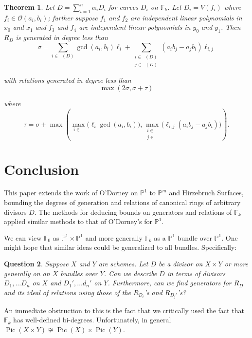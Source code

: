 \documentclass{amsart}
\theoremstyle{plain}
\newtheorem{thm}{Theorem}[section]
\newtheorem{question}[thm]{Question}
\theoremstyle{definition}
\theoremstyle{remark}
\numberwithin{equation}{section}
\newcommand\bp{{\mathbb P}}
\newcommand\sco{{\mathscr O}}
\newcommand\bida{a}
\newcommand\bidb{b}
\newcommand\hirz{\mathbb{F}}
\DeclareMathOperator{\Te}{T_=}
\DeclareMathOperator{\Tp}{T_+}
\DeclareMathOperator{\Tm}{T_-}
\DeclareMathOperator{\Pic}{Pic}
\begin{document}
\begin{thm}
\label{thm:hirz-generators-relations}
Let $D = \sum_{i=1}^n \alpha_i D_i$ for curves $D_i$ on $\hirz_k$.  Let $D_i = V(f_i)$ where $f_i \in \sco(a_i, b_i)$; further suppose $f_1$ and $f_2$ are independent linear
polynomials in $x_0$ and $x_1$ and $f_3$ and $f_4$ are independent
linear polynomials in $y_0$ and $y_1$.
Then $R_D$ is generated in degree less than 
\[
	\sigma = \sum_{i\in \Te(D)} \gcd(\bida_i, \bidb_i)\ell_i +
	\sum_{\substack{i \in \Tp(D) \\	j \in \Tm(D)}} (\bida_i \bidb_j
	- \bida_j \bidb_i) \ell_{i, j}
\]

\noindent
with relations generated in degree less than 
\[
	\max(2 \sigma, \sigma + \tau)
\]

\noindent
where
\[
	\tau = \sigma
	+ \max \left( \max_{i\in \Te} \bigl(\ell_i \gcd(a_i, b_i) \bigr),
	\max_{\substack{i \in \Tp \\ j \in \Tm}} \bigl(\ell_{i, j}
	(\bida_i \bidb_j - \bida_j \bidb_i) \bigr) \right).
\]
\end{thm}


\section{Conclusion}
\label{sec:conc}
This paper extends the work of O'Dorney \cite{dorney:canonical} on $\bp^1$ to $\bp^m$ and Hirzebruch Surfaces, bounding the degrees of generation and relations of canonical rings of arbitrary divisors $D$.  The methods for deducing bounds on generators and relations of $\hirz_k$ applied similar methods to that of O'Dorney's for $\bp^1$.  

We can view $\hirz_0$ as $\bp^1\times \bp^1$ and more generally $\hirz_k$ as a $\bp^1$ bundle over $\bp^1$.  One might hope that similar ideas could be generalized to all bundles.  Specifically:
\begin{question}
\label{qn:general-product-bundle}
Suppose $X$ and $Y$ are schemes.  Let $D$ be a divisor on $X\times Y$ or more generally on an $X$ bundles over $Y$.  Can we describe $D$ in terms of divisors $D_1, \ldots D_n$ on $X$ and $D_1', \ldots d_n'$ on $Y$.  Furthermore, can we find generators for $R_D$ and its ideal of relations using those of the $R_{D_i}$'s and $R_{D_j'}$'s?
\end{question}

An immediate obstruction to this is the fact that we critically used the fact that $\hirz_k$ has well-defined bi-degrees.  Unfortunately, in general $\Pic(X \times Y) \not \cong \Pic(X) \times \Pic(Y)$.
\end{document}
